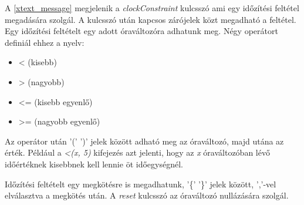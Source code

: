 A \ref{xtext_message} megjelenik a \textit{clockConstraint} kulcsszó ami egy időzítési feltétel megadására szolgál.
A kulcsszó után kapcsos zárójelek közt megadható a feltétel.
Egy időzítési feltételt egy adott óraváltozóra adhatunk meg.
Négy operátort definiál ehhez a nyelv:
\begin{itemize}
    \item < (kisebb)
    \item > (nagyobb)
    \item <= (kisebb egyenlő)
    \item >= (nagyobb egyenlő)
\end{itemize}
Az operátor után ’(’ ’)’ jelek között adható meg az óraváltozó, majd utána az érték.
Például a \textit{<(x, 5)} kifejezés azt jelenti, hogy az \textit{x} óraváltozóban lévő időértéknek kisebbnek kell lennie öt időegységnél.

Időzítési feltételt egy megkötésre is megadhatunk, '\{' '\}' jelek között, ’,’-vel elválasztva a megkötés után.
A \textit{reset} kulcsszó az óraváltozó nullázására szolgál.